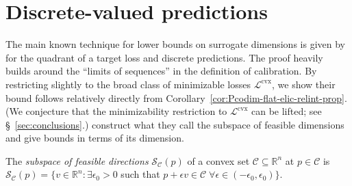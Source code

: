 \documentclass[anon,12pt]{colt2021} %
\newcommand{\Comments}{1}
\newcommand{\mynote}[2]{\ifnum\Comments=1\textcolor{#1}{#2}\fi}
\newcommand{\mytodo}[2]{\ifnum\Comments=1%
	\todo[linecolor=#1!80!black,backgroundcolor=#1,bordercolor=#1!80!black]{#2}\fi}
\newcommand{\jessiet}[1]{\mytodo{purple!20!white}{JF: #1}}
\newcommand{\bo}[1]{\mynote{blue}{[Bo: #1]}}
\newcommand{\reals}{\mathbb{R}}
\newcommand{\C}{\mathcal{C}}
\newcommand{\Lcvx}{\mathcal{L}^{\mathrm{cvx}}}
\newcommand{\Sc}{\mathcal{S}}  %
\begin{document}

\section{Discrete-valued predictions}\label{sec:finite-calib}

The main known technique for lower bounds on surrogate dimensions is given by \citet{ramaswamy2016convex} for the quadrant of a target loss and discrete predictions.
The proof heavily builds around the ``limits of sequences'' in the definition of calibration.
By restricting slightly to the broad class of minimizable losses $\Lcvx$, we show their bound follows relatively directly from Corollary~\ref{cor:Pcodim-flat-elic-relint-prop}.
(We conjecture that the minimizability restriction to $\Lcvx$ can be lifted; see \S~\ref{sec:conclusions}.)
\citet{ramaswamy2016convex} construct what they call the subspace of feasible dimensions and give bounds in terms of its dimension.
\begin{definition}\label{def:subspace-feas}
	The \emph{subspace of feasible directions} $\Sc_\C(p)$ of a convex set $\C \subseteq \reals^n$ at $p \in \C$ is $\Sc_\C(p) = \{ v \in \reals^n : \exists \epsilon_0 > 0 $ such that $p + \epsilon v \in \C \; \forall \epsilon \in (-\epsilon_0,\epsilon_0) \}$.
\end{definition}
\end{document}
